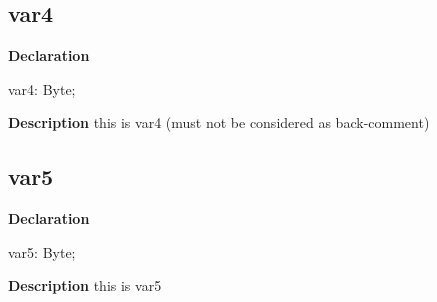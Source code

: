 \documentclass{report}
\newif\ifpdf
\begin{document}
\subsection*{var4}
\fi
\label{ok_auto_back_comments-var4}
\begin{list}{}{
\setlength{\itemindent}{0cm}
\setlength{\listparindent}{0cm}
\setlength{\leftmargin}{\evensidemargin}
\addtolength{\leftmargin}{\tmplength}
\settowidth{\labelsep}{X}
\addtolength{\leftmargin}{\labelsep}
\setlength{\labelwidth}{\tmplength}
}
\item[\textbf{Declaration}\hfill]
\ifpdf
\begin{flushleft}
\fi
\begin{ttfamily}
var4: Byte;\end{ttfamily}

\ifpdf
\end{flushleft}
\fi

\par
\item[\textbf{Description}]
this is var4 (must not be considered as back{-}comment)

\end{list}
\ifpdf
\subsection*{\large{\textbf{var5}}\normalsize\hspace{1ex}\hrulefill}
\else
\subsection*{var5}
\fi
\label{ok_auto_back_comments-var5}
\begin{list}{}{
\setlength{\itemindent}{0cm}
\setlength{\listparindent}{0cm}
\setlength{\leftmargin}{\evensidemargin}
\addtolength{\leftmargin}{\tmplength}
\settowidth{\labelsep}{X}
\addtolength{\leftmargin}{\labelsep}
\setlength{\labelwidth}{\tmplength}
}
\item[\textbf{Declaration}\hfill]
\ifpdf
\begin{flushleft}
\fi
\begin{ttfamily}
var5: Byte;\end{ttfamily}

\ifpdf
\end{flushleft}
\fi

\par
\item[\textbf{Description}]
this is var5

\end{list}
\end{document}
